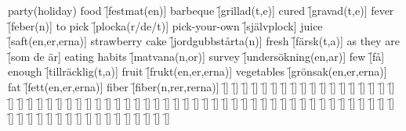 \begin{questions}
\begin{multicols}{2}
        \question party(holiday) food \f[festmat(en)]
        \question barbeque \f[grillad(t,e)]
        \question cured \f[gravad(t,e)]
        \question fever \f[feber(n)]
        \question to pick \f[plocka(r/de/t)]
        \question pick-your-own \f[självplock]
        \question juice \f[saft(en,er,erna)]
        \question strawberry cake \f[jordgubbstårta(n)]
        \question fresh \f[färsk(t,a)]
        \question as they are \f[som de är]
        \question eating habits \f[matvana(n,or)]
        \question survey \f[undersökning(en,ar)]
        \question few \f[få]
        \question enough \f[tillräcklig(t,a)]
        \question fruit \f[frukt(en,er,erna)]
        \question vegetables \f[grönsak(en,er,erna)]
        \question fat \f[fett(en,er,erna)]
        \question fiber \f[fiber(n,rer,rerna)]
        \question  \f[]
        \question  \f[]
        \question  \f[]
        \question  \f[]
        \question  \f[]
        \question  \f[]
        \question  \f[]
        \question  \f[]
        \question  \f[]
        \question  \f[]
        \question  \f[]
        \question  \f[]
        \question  \f[]
        \question  \f[]
        \question  \f[]
        \question  \f[]
        \question  \f[]
        \question  \f[]
        \question  \f[]
        \question  \f[]
        \question  \f[]
        \question  \f[]
        \question  \f[]
        \question  \f[]
        \question  \f[]
        \question  \f[]
        \question  \f[]
        \question  \f[]
        \question  \f[]
        \question  \f[]
        \question  \f[]
        \question  \f[]
        \question  \f[]
        \question  \f[]
        \question  \f[]
        \question  \f[]
        \question  \f[]
        \question  \f[]
        \question  \f[]
        \question  \f[]
        \question  \f[]
        \question  \f[]
        \question  \f[]
        \question  \f[]
        \question  \f[]
        \question  \f[]
        \question  \f[]
        \question  \f[]
        \question  \f[]
        \question  \f[]
        \question  \f[]
        \question  \f[]
        \question  \f[]
        \question  \f[]
        \question  \f[]
        \question  \f[]
        \question  \f[]
        \question  \f[]
        \question  \f[]
        \question  \f[]
        \question  \f[]
        \question  \f[]
        \question  \f[]
        \question  \f[]
        \question  \f[]
        \question  \f[]
        \question  \f[]
        \question  \f[]
        \question  \f[]
        \question  \f[]
        \question  \f[]
        \question  \f[]
        \question  \f[]
        \question  \f[]
        \question  \f[]

\end{multicols}
\end{questions}
